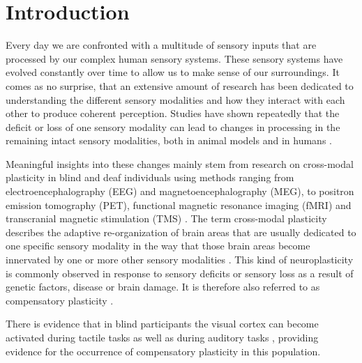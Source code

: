 \documentclass[12pt]{article}
\begin{document}
\section{Introduction}
Every day we are confronted with a multitude of sensory inputs that are processed by our complex human sensory systems. These sensory systems have evolved constantly over time to allow us to make sense of our surroundings. It comes as no surprise, that an extensive  amount of research has been dedicated to understanding the different sensory modalities and how they interact with each other to produce coherent perception. Studies have shown repeatedly that the deficit or loss of one sensory modality can lead to changes in processing in the remaining intact sensory modalities, both in animal models \parencite{lomber_cross-modal_2010, rauschecker_compensatory_1995, schroeder_somatosensory_2001} and in humans \parencite{bavelier_visual_2000,gougoux_pitch_2004, hong_lore_central_1991, levanen_vibration-induced_1998, shiell_enhancement_2014}. 
\par Meaningful insights into these changes mainly stem from research on cross-modal plasticity in blind and deaf individuals using methods ranging from electroencephalography (EEG) and magnetoencephalography (MEG), to positron emission tomography (PET), functional magnetic resonance imaging (fMRI) and transcranial magnetic stimulation (TMS) \parencite[for reviews, see][]{bavelier_deaf_2006,bavelier_cross-modal_2002,merabet_neural_2010,roder_compensatory_2004,voss_adaptation_2010}. The term cross-modal plasticity describes the adaptive re-organization of brain areas that are usually dedicated to one specific sensory modality in the way that those brain areas become innervated by one or more other sensory modalities \parencite{roder_compensatory_2004}. This kind of neuroplasticity is commonly observed in response to sensory deficits or sensory loss as a result of genetic factors, disease or brain damage. It is therefore also referred to as compensatory plasticity \parencite{lazzouni_compensatory_2014, roder_compensatory_2004}. 
%
\par There is evidence that in blind participants the visual cortex can become activated during tactile tasks \parencite{buchel_different_1998,burton_cortical_2004,cohen_functional_1997,sadato_activation_1996} as well as during auditory tasks \parencite{gougoux_functional_2005,kujala_visual_1995,voss_differential_2008}, providing evidence for the occurrence of compensatory plasticity in this population.
\end{document}
